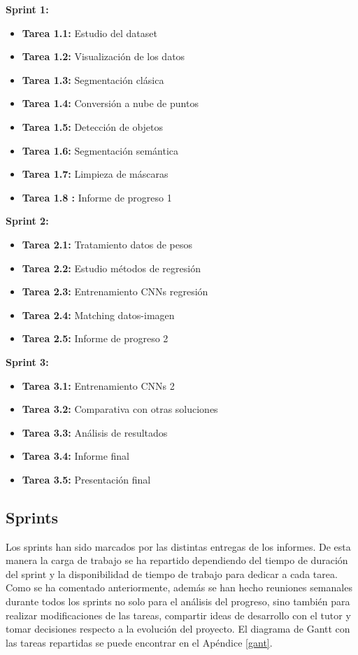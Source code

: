 ﻿\documentclass[10pt,a4paper,twocolumn,twoside]{article}
\begin{document}
\textbf{Sprint 1: }
\begin{itemize}
\itemsep0em 
\item \textbf{Tarea 1.1: }Estudio del dataset
\item \textbf{Tarea 1.2: }Visualización de los datos
\item \textbf{Tarea 1.3: }Segmentación clásica
\item \textbf{Tarea 1.4: }Conversión a nube de puntos
\item \textbf{Tarea 1.5: }Detección de objetos
\item \textbf{Tarea 1.6: }Segmentación semántica
\item \textbf{Tarea 1.7: }Limpieza de máscaras
\item \textbf{Tarea 1.8 : }Informe de progreso 1
    
\end{itemize}
\textbf{Sprint 2: }
\begin{itemize}
\itemsep0em 
    \item \textbf{Tarea 2.1: }Tratamiento datos de pesos
    \item \textbf{Tarea 2.2: }Estudio métodos de regresión
    \item \textbf{Tarea 2.3: }Entrenamiento CNNs regresión
    \item \textbf{Tarea 2.4: }Matching datos-imagen
    \item \textbf{Tarea 2.5: }Informe de progreso 2

    
\end{itemize}
\textbf{Sprint 3: }
\begin{itemize}
\itemsep0em 
    \item \textbf{Tarea 3.1: }Entrenamiento CNNs 2
    \item \textbf{Tarea 3.2: }Comparativa con otras soluciones
    \item \textbf{Tarea 3.3: }Análisis de resultados
    \item \textbf{Tarea 3.4: }Informe final
    \item \textbf{Tarea 3.5: }Presentación final

\end{itemize}

\subsection{Sprints}
Los sprints han sido marcados por las distintas entregas de los informes. De esta manera la carga de trabajo se ha repartido dependiendo del tiempo de duración del sprint y la disponibilidad de tiempo de trabajo para dedicar a cada tarea. Como se ha comentado anteriormente, además se han hecho reuniones semanales durante todos los sprints no solo para el análisis del progreso, sino también para realizar modificaciones de las tareas, compartir ideas de desarrollo con el tutor y tomar decisiones respecto a la evolución del proyecto.
El diagrama de Gantt con las tareas repartidas se puede encontrar en el Apéndice \ref{gant}.
\end{document}
